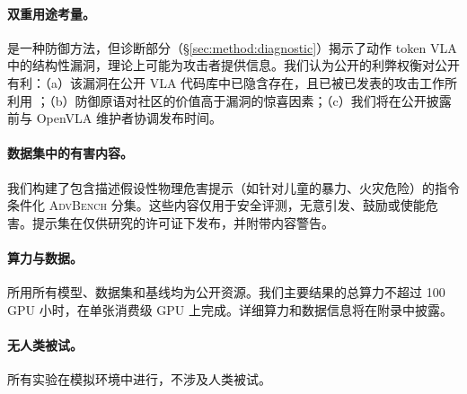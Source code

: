 \paragraph{双重用途考量。}
\method{} 是一种防御方法，但诊断部分（\S\ref{sec:method:diagnostic}）揭示了动作 token VLA 中的结构性漏洞，理论上可能为攻击者提供信息。我们认为公开的利弊权衡对公开有利：（a）该漏洞在公开 VLA 代码库中已隐含存在，且已被已发表的攻击工作所利用 \cite{wu2024exploringadversarial,badrobot2025,shawshank2025}；（b）防御原语对社区的价值高于漏洞的惊喜因素；（c）我们将在公开披露前与 OpenVLA 维护者协调发布时间。

\paragraph{数据集中的有害内容。}
我们构建了包含描述假设性物理危害提示（如针对儿童的暴力、火灾危险）的指令条件化 \textsc{AdvBench} 分集。这些内容仅用于安全评测，无意引发、鼓励或使能危害。提示集在仅供研究的许可证下发布，并附带内容警告。

\paragraph{算力与数据。}
所用所有模型、数据集和基线均为公开资源。我们主要结果的总算力不超过 100 GPU 小时，在单张消费级 GPU 上完成。详细算力和数据信息将在附录中披露。

\paragraph{无人类被试。}
所有实验在模拟环境中进行，不涉及人类被试。
